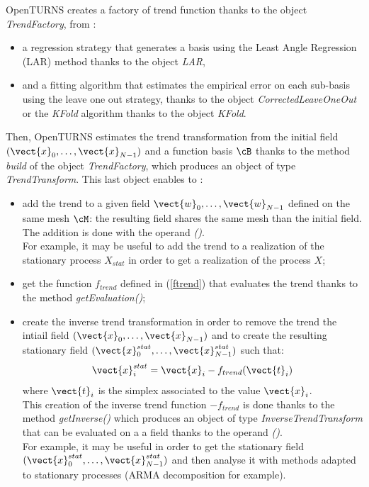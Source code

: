 OpenTURNS creates a factory of trend function thanks to the  object \emph{TrendFactory},  from :
\begin{itemize}
\item a regression strategy that generates a basis using the Least Angle Regression (LAR) method thanks to the object \emph{LAR},
\item and a fitting algorithm that estimates the empirical error on each sub-basis using the leave one out strategy, thanks to the object \emph{CorrectedLeaveOneOut} or the \emph{KFold} algorithm thanks to the object \emph{KFold}.
\end{itemize}
Then, OpenTURNS estimates the trend transformation from the initial field  $(\vect{x}_0, \dots, \vect{x}_{N-1})$ and a function basis $\cB$ thanks to the method \emph{build} of the object \emph{TrendFactory}, which produces an object of type \emph{TrendTransform}. This last object enables to :
\begin{itemize}
\item  add the trend to a given field $\vect{w}_0, \dots, \vect{w}_{N-1}$ defined on the same mesh $\cM$: the resulting field  shares the same mesh than the initial field. The addition is done with  the operand  \emph{()}. \\
  For example, it may be useful to add the trend to a realization of the stationary process $X_{stat}$ in order to get a realization of the process $X$;
\item get the function $f_{trend}$ defined in (\ref{ftrend}) that evaluates the trend thanks to the method \emph{getEvaluation()};
\item create the inverse trend transformation in order to remove the trend the intiail field  $(\vect{x}_0, \dots, \vect{x}_{N-1})$ and  to create the resulting stationary field $(\vect{x}^{stat}_0, \dots, \vect{x}^{stat}_{N-1})$ such that:
  \begin{align}
    \vect{x}^{stat}_i = \vect{x}_i - f_{trend}(\vect{t}_i)
  \end{align}
  where $\vect{t}_i$ is the simplex associated to the value $ \vect{x}_i$.\\
  This creation of the inverse trend function $-f_{trend}$ is done thanks to the method \emph{getInverse()} which produces an object of type \emph{InverseTrendTransform} that can be evaluated on a a field thanks to the operand  \emph{()}. \\
  For example, it may be useful in order to get the stationary field $(\vect{x}^{stat}_0, \dots, \vect{x}^{stat}_{N-1})$ and then analyse it with  methods adapted to stationary processes (ARMA decomposition for example).
\end{itemize}


